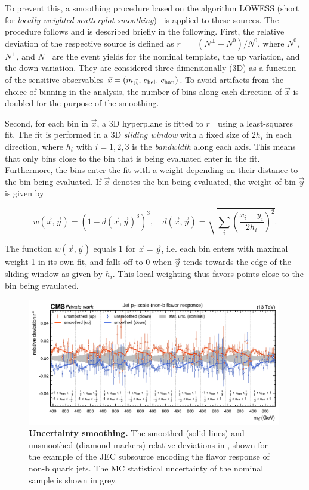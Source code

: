 To prevent this, a smoothing procedure based on the algorithm LOWESS (short for \textit{locally weighted scatterplot smoothing})~\cite{Cleveland:1979,Cleveland:1988} is applied to these sources. The procedure follows  and is described briefly in the following. First, the relative deviation of the respective source is defined as $r^\pm = (N^\pm - N^0) / N^0$, where $N^0$, $N^+$, and $N^-$ are the event yields for the nominal template, the up variation, and the down variation. They are considered three-dimensionally (3D) as a function of the sensitive observables $\vec{x} = (m_{\mathrm{t \bar{t}}}, \, c_{\mathrm{hel}}, \, c_{\mathrm{han}})$. To avoid artifacts from the choice of binning in the analysis, the number of bins along each direction of $\vec{x}$ is doubled for the purpose of the smoothing.

Second, for each bin in $\vec{x}$, a 3D hyperplane is fitted to $r^\pm$ using a least-squares fit. The fit is performed in a 3D \textit{sliding window} with a fixed size of $2 h_i$ in each direction, where $h_i$ with $i = 1,2,3$ is the \textit{bandwidth} along each axis. This means that only bins close to the bin that is being evaluated enter in the fit. Furthermore, the bins enter the fit with a weight depending on their distance to the bin being evaluated. If $\vec{x}$ denotes the bin being evaluated, the weight of bin $\vec{y}$ is given by~\cite{Anuar:PhD}

\begin{equation}
    w (\vec{x}, \vec{y}) = \left( 1 - d(\vec{x}, \vec{y})^3 \right)^3, \quad d(\vec{x}, \vec{y}) = \sqrt{ \sum_i \left( \frac{x_i - y_i}{2 h_i} \right)^2 } .
\end{equation}

The function $w (\vec{x}, \vec{y})$ equals 1 for $\vec{x} = \vec{y}$, i.e. each bin enters with maximal weight 1 in its own fit, and falls off to 0 when $\vec{y}$ tends towards the edge of the sliding window as given by $h_i$. This local weighting thus favors points close to the bin being evaulated.

\begin{figure}[!t]
    \centering
    \includegraphics[width=0.99\textwidth]{figures/ah/smoothing_example.pdf}
    \caption{
        \textbf{Uncertainty smoothing.} The smoothed (solid lines) and unsmoothed (diamond markers) relative deviations in \mttchelchan, shown for the example of the JEC subsource encoding the flavor response of non-b quark jets. The MC statistical uncertainty of the nominal sample is shown in grey. 
    }
    \label{fig:ah:smoothing}
\end{figure}


